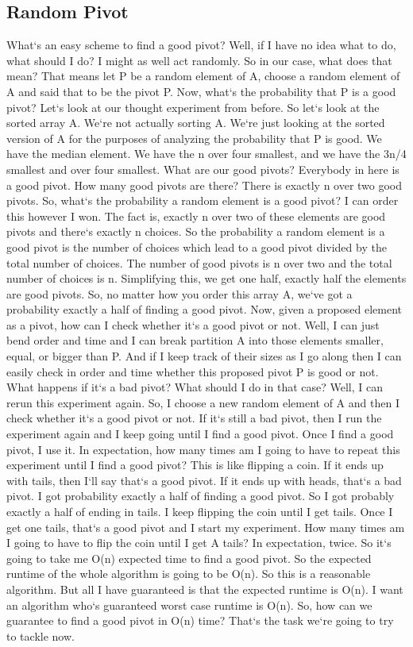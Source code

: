 \subsection{Random Pivot}
What`s an easy scheme to find a good pivot? Well, if I have no idea what to do, what should I do? I might as well act randomly.
So in our case, what does that mean? That means let P be a random element of A, choose a random element of A and said that to be the pivot P\@.
Now, what`s the probability that P is a good pivot? Let`s look at our thought experiment from before.
So let`s look at the sorted array A\@.
We`re not actually sorting A\@.
We`re just looking at the sorted version of A for the purposes of analyzing the probability that P is good.
We have the median element.
We have the n over four smallest, and we have the 3n/4 smallest and over four smallest.
What are our good pivots? Everybody in here is a good pivot.
How many good pivots are there? There is exactly n over two good pivots.
So, what`s the probability a random element is a good pivot? I can order this however I won.
The fact is, exactly n over two of these elements are good pivots and there`s exactly n choices.
So the probability a random element is a good pivot is the number of choices which lead to a good pivot divided by the total number of choices.
The number of good pivots is n over two and the total number of choices is n.
Simplifying this, we get one half, exactly half the elements are good pivots.
So, no matter how you order this array A, we`ve got a probability exactly a half of finding a good pivot.
Now, given a proposed element as a pivot, how can I check whether it`s a good pivot or not.
Well, I can just bend order and time and I can break partition A into those elements smaller, equal, or bigger than P\@.
And if I keep track of their sizes as I go along then I can easily check in order and time whether this proposed pivot P is good or not.
What happens if it`s a bad pivot? What should I do in that case? Well, I can rerun this experiment again.
So, I choose a new random element of A and then I check whether it`s a good pivot or not.
If it`s still a bad pivot, then I run the experiment again and I keep going until I find a good pivot.
Once I find a good pivot, I use it.
In expectation, how many times am I going to have to repeat this experiment until I find a good pivot? This is like flipping a coin.
If it ends up with tails, then I`ll say that`s a good pivot.
If it ends up with heads, that`s a bad pivot.
I got probability exactly a half of finding a good pivot.
So I got probably exactly a half of ending in tails.
I keep flipping the coin until I get tails.
Once I get one tails, that`s a good pivot and I start my experiment.
How many times am I going to have to flip the coin until I get A tails? In expectation, twice.
So it`s going to take me O(n) expected time to find a good pivot.
So the expected runtime of the whole algorithm is going to be O(n).
So this is a reasonable algorithm.
But all I have guaranteed is that the expected runtime is O(n).
I want an algorithm who`s guaranteed worst case runtime is O(n).
So, how can we guarantee to find a good pivot in O(n) time? That`s the task we`re going to try to tackle now.

